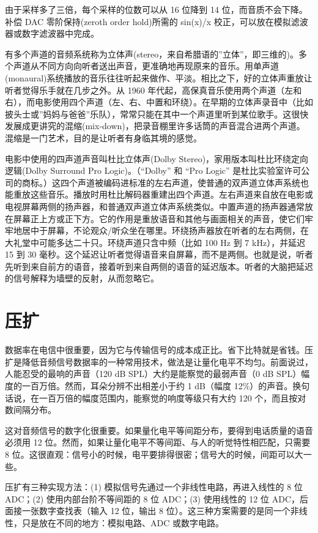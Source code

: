 由于采样多了三倍，每个采样的位数可以从 16 位降到 14
位，而音质不会下降。补偿 DAC 零阶保持(zeroth order hold)所需的 sin(x)/x
校正，可以放在模拟滤波器或数字滤波器中完成。

有多个声道的音频系统称为立体声(stereo，来自希腊语的''立体''，即三维的)。多个声道从不同方向向听者送出声音，更准确地再现原来的音乐。用单声道(monaural)系统播放的音乐往往听起来做作、平淡。相比之下，好的立体声重放让听者觉得乐手就在几步之外。从
1960
年代起，高保真音乐使用两个声道（左和右），而电影使用四个声道（左、右、中置和环绕）。在早期的立体声录音中（比如披头士或''妈妈与爸爸''乐队），常常只能在其中一个声道里听到某位歌手。这很快发展成更讲究的混缩(mix-down)，把录音棚里许多话筒的声音混合进两个声道。混缩是一门艺术，目的是让听者有身临其境的感觉。

电影中使用的四声道声音叫杜比立体声(Dolby
Stereo)，家用版本叫杜比环绕定向逻辑(Dolby Surround Pro
Logic)。（``Dolby'' 和 ``Pro Logic''
是杜比实验室许可公司的商标。）这四个声道被编码进标准的左右声道，使普通的双声道立体声系统也能重放这些音乐。播放时用杜比解码器重建出四个声道。左右声道来自放在电影或电视屏幕两侧的扬声器，和普通双声道立体声系统类似。中置声道的扬声器通常放在屏幕正上方或正下方。它的作用是重放语音和其他与画面相关的声音，使它们牢牢地居中于屏幕，不论观众/听众坐在哪里。环绕扬声器放在听者的左右两侧，在大礼堂中可能多达二十只。环绕声道只含中频（比如
100 Hz 到 7 kHz），并延迟 15 到 30
毫秒。这个延迟让听者觉得语音来自屏幕，而不是两侧。也就是说，听者先听到来自前方的语音，接着听到来自两侧的语音的延迟版本。听者的大脑把延迟的信号解释为墙壁的反射，从而忽略它。

\section{压扩}

数据率在电信中很重要，因为它与传输信号的成本成正比。省下比特就是省钱。压扩是降低音频信号数据率的一种常用技术，做法是让量化电平不均匀。前面说过，人能忍受的最响的声音（120
dB SPL）大约是能察觉的最弱声音（0 dB
SPL）幅度的一百万倍。然而，耳朵分辨不出相差小于约 1 dB（幅度
12\%）的声音。换句话说，在一百万倍的幅度范围内，能察觉的响度等级只有大约
120 个，而且按对数间隔分布。

这对音频信号的数字化很重要。如果量化电平等间距分布，要得到电话质量的语音必须用
12 位。然而，如果让量化电平不等间距、与人的听觉特性相匹配，只需要 8
位。这很直观：信号小的时候，电平要排得很密；信号大的时候，间距可以大一些。

压扩有三种实现方法：(1) 模拟信号先通过一个非线性电路，再进入线性的 8 位
ADC；(2) 使用内部台阶不等间距的 8 位 ADC；(3) 使用线性的 12 位
ADC，后面接一张数字查找表（输入 12 位，输出 8
位）。这三种方案需要的是同一个非线性，只是放在不同的地方：模拟电路、ADC
或数字电路。

